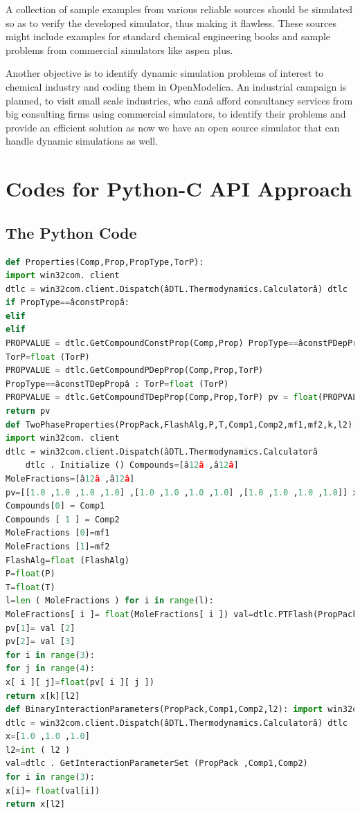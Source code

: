 \documentclass[12pt]{report}
\begin{document}
A collection of sample examples from various reliable sources should be simulated so as to verify the developed simulator, thus making it flawless. These sources might include examples for standard chemical engineering books and sample problems from commercial simulators like aspen plus.

Another objective is to identify dynamic simulation problems of interest to chemical industry and coding them in OpenModelica. An industrial campaign is planned, to visit small scale industries, who canâ  afford consultancy services from big consulting firms using commercial simulators, to identify their problems and provide an efficient solution as now we have an open source simulator that can handle dynamic simulations as well.

\appendix
\chapter{Codes for Python-C API Approach}
\label{appenA}
\section{The Python Code}
\begin{lstlisting}[language=Python]
def Properties(Comp,Prop,PropType,TorP):
import win32com. client
dtlc = win32com.client.Dispatch(âDTL.Thermodynamics.Calculatorâ) dtlc . Initialize ()
if PropType==âconstPropâ:
elif
elif
PROPVALUE = dtlc.GetCompoundConstProp(Comp,Prop) PropType==âconstPDepPropâ :
TorP=float (TorP)
PROPVALUE = dtlc.GetCompoundPDepProp(Comp,Prop,TorP)
PropType==âconstTDepPropâ : TorP=float (TorP)
PROPVALUE = dtlc.GetCompoundTDepProp(Comp,Prop,TorP) pv = float(PROPVALUE)
return pv
def TwoPhaseProperties(PropPack,FlashAlg,P,T,Comp1,Comp2,mf1,mf2,k,l2):
import win32com. client
dtlc = win32com.client.Dispatch(âDTL.Thermodynamics.Calculatorâ
	dtlc . Initialize () Compounds=[â12â ,â12â]
MoleFractions=[â12â ,â12â]
pv=[[1.0 ,1.0 ,1.0 ,1.0] ,[1.0 ,1.0 ,1.0 ,1.0] ,[1.0 ,1.0 ,1.0 ,1.0]] x=[[1.0 ,1.0 ,1.0 ,1.0] ,[1.0 ,1.0 ,1.0 ,1.0] ,[1.0 ,1.0 ,1.0,1.0]] 
Compounds[0] = Comp1
Compounds [ 1 ] = Comp2
MoleFractions [0]=mf1
MoleFractions [1]=mf2
FlashAlg=float (FlashAlg)
P=float(P)
T=float(T)
l=len ( MoleFractions ) for i in range(l):
MoleFractions[ i ]= float(MoleFractions[ i ]) val=dtlc.PTFlash(PropPack, FlashAlg, P, T,Compounds, MoleFractio pv[0] = val[1]
pv[1]= val [2]
pv[2]= val [3]
for i in range(3):
for j in range(4):
x[ i ][ j]=float(pv[ i ][ j ])
return x[k][l2]
def BinaryInteractionParameters(PropPack,Comp1,Comp2,l2): import win32com. client
dtlc = win32com.client.Dispatch(âDTL.Thermodynamics.Calculatorâ) dtlc . Initialize ()
x=[1.0 ,1.0 ,1.0]
l2=int ( l2 )
val=dtlc . GetInteractionParameterSet (PropPack ,Comp1,Comp2)
for i in range(3):
x[i]= float(val[i])
return x[l2]
\end{lstlisting}
\end{document}
